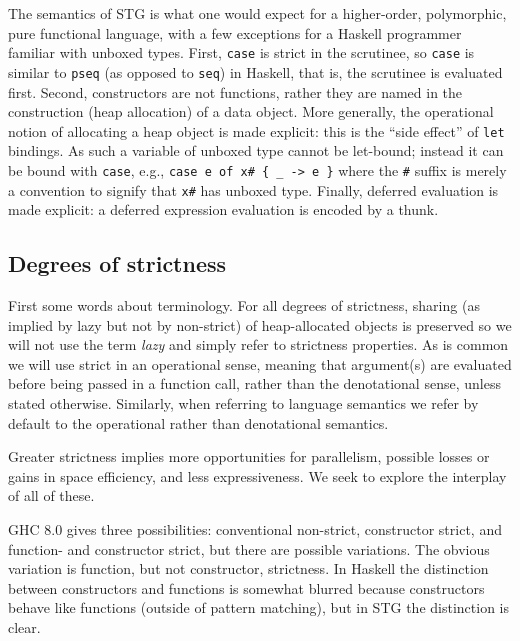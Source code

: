 \documentclass{llncs}
\begin{document}
The semantics of STG is what one would expect for a higher-order, polymorphic,
pure functional language, with a few exceptions for a Haskell programmer
familiar with unboxed types.  First, \texttt{case} is strict in the scrutinee,
so \texttt{case} is similar to \texttt{pseq} (as opposed to \texttt{seq}) in
Haskell, that is, the scrutinee is evaluated first.  Second, constructors are
not functions, rather they are named in the construction (heap allocation) of
a data object.  More generally, the operational notion of allocating a heap
object is made explicit: this is the ``side effect'' of \texttt{let} bindings.
As such a variable of unboxed type cannot be let-bound; instead it can be
bound with \texttt{case}, e.g., \texttt{case e of x\# \{ \_ -> e \}}
where the \texttt{\#} suffix is merely a convention to signify that
\texttt{x\#} has unboxed type.  Finally, deferred evaluation is made explicit:
a deferred expression evaluation is encoded by a thunk.

\subsection{Degrees of strictness}
First some words about terminology.  For all degrees of strictness, sharing
(as implied by lazy but not by non-strict) of heap-allocated objects is
preserved so we will not use the term \emph{lazy} and simply refer to
strictness properties.  As is common we will use strict in an operational
sense, meaning that argument(s) are evaluated before being passed in a
function call, rather than the denotational sense, unless stated otherwise.
Similarly, when referring to language semantics we refer by default to the
operational rather than denotational semantics.

Greater strictness implies more opportunities for parallelism, possible losses
or gains in space efficiency, and less expressiveness.  We seek to explore
the interplay of all of these.

GHC 8.0 gives three possibilities: conventional non-strict, constructor
strict, and function- and constructor strict, but there are possible
variations.  The obvious variation is function, but not constructor,
strictness.  In Haskell the distinction between constructors and functions is
somewhat blurred because constructors behave like functions (outside of
pattern matching), but in STG the distinction is clear.
\end{document}
